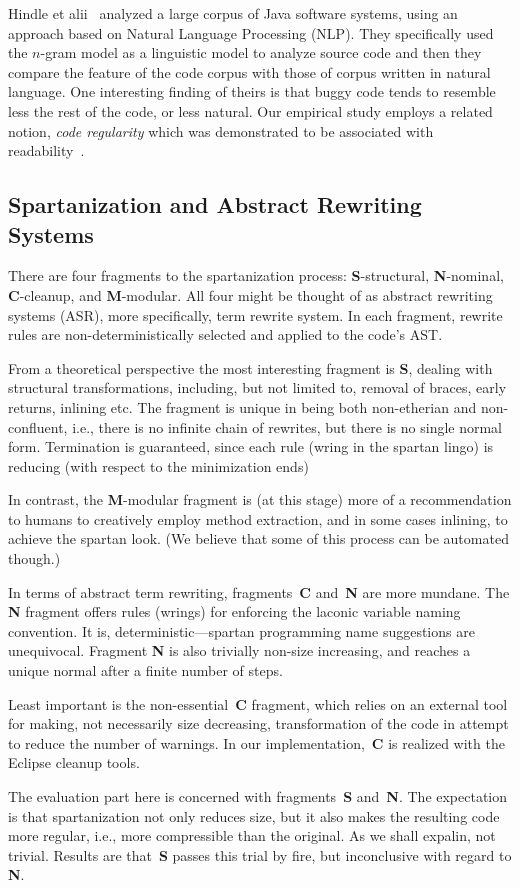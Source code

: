Hindle et alii~\cite{Hindle:Bar:Su:Gabel:Devanbu:12} analyzed a large corpus of
Java software systems, using an approach based on Natural Language Processing
(NLP).  They specifically used the $n$-gram model as a linguistic model to
analyze source code and then they compare the feature of the code corpus with
those of corpus written in natural language. One interesting finding of theirs
is that buggy code tends to resemble less the rest of the code, or less
natural. Our empirical study employs a related notion, \emph{code regularity}
which was demonstrated to be associated with
readability~\cite{Jbara:Feitelson:14}.

\subsection{Spartanization and Abstract Rewriting Systems}

There are four fragments to the spartanization process: \textbf{S}-structural,
\textbf{N}-nominal, \textbf{C}-cleanup, and \textbf{M}-modular. All four might
be thought of as abstract rewriting systems (ASR), more specifically, term
rewrite system. In each fragment, rewrite rules are non-deterministically
selected and applied to the code's AST. 

From a theoretical perspective the most interesting fragment is \textbf{S},
dealing with structural transformations, including, but not limited to, removal
of braces, early returns, inlining etc.  The fragment is unique in being both
non-etherian and non-confluent, i.e., there is no infinite chain of rewrites,
but there is no single normal form.  Termination is guaranteed, since each rule
(wring in the spartan lingo) is reducing (with respect to the minimization
ends) 

In contrast, the \textbf{M}-modular fragment is (at this stage) more of a
recommendation to humans to creatively employ method extraction, and in some
cases inlining, to achieve the spartan look. (We believe that some of this
process can be automated though.) 

In terms of abstract term rewriting, fragments~\textbf{C} and~\textbf{N} are
more mundane. The \textbf{N} fragment offers rules (wrings) for enforcing the
laconic variable naming convention. It is, deterministic---spartan programming
name suggestions are unequivocal. Fragment \textbf{N} is also trivially
non-size increasing, and reaches a unique normal after a finite number of
steps. 

Least important is the non-essential~\textbf{C} fragment, which relies on an
external tool for making, not necessarily size decreasing, transformation of
the code in attempt to reduce the number of warnings. In our
implementation,~\textbf{C} is realized with the Eclipse cleanup tools.

The evaluation part here is concerned with fragments~\textbf{S} 
and~\textbf{N}.  The expectation is that spartanization not only 
reduces size, but it also makes the resulting code more regular,
i.e., more compressible than the original. As we shall expalin, 
not trivial. Results are that~\textbf{S} passes this trial by fire,
but inconclusive with regard to \textbf{N}. 
